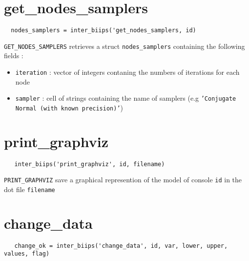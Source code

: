 \documentclass[11pt]{article}
\begin{document}
\section{get\_nodes\_samplers}

 \begin{lstlisting}
  nodes_samplers = inter_biips('get_nodes_samplers, id)
 \end{lstlisting}
  
  \texttt{GET\_NODES\_SAMPLERS} retrieves a struct \texttt{nodes\_samplers} containing the following fields  :

  \begin{itemize}
   \item \texttt{iteration} : vector of integers contaning the numbers of iterations for each node
   \item \texttt{sampler} : cell of strings containing the name of samplers (e.g \texttt{'Conjugate Normal (with known precision)'}) 
   \end{itemize}


\section{print\_graphviz}

 \begin{lstlisting}
   inter_biips('print_graphviz', id, filename)
 \end{lstlisting}
 
  \texttt{PRINT\_GRAPHVIZ} save a graphical represention of the model of console \texttt{id} in the dot file \texttt{filename}

\section{change\_data}

 \begin{lstlisting}
   change_ok = inter_biips('change_data', id, var, lower, upper, values, flag)
 \end{lstlisting}
\end{document}
